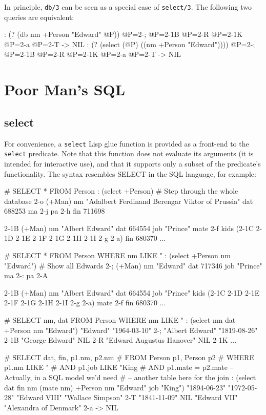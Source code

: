 In principle, \texttt{db/3} can be seen as a special case of \texttt{select/3}. The
following two queries are equivalent:


\begin{wideverbatim}
: (? (db nm +Person "Edward" @P))
 @P={2-;}
 @P={2-1B}
 @P={2-R}
 @P={2-1K}
 @P={2-a}
 @P={2-T}
-> NIL
: (? (select (@P) ((nm +Person "Edward"))))
 @P={2-;}
 @P={2-1B}
 @P={2-R}
 @P={2-1K}
 @P={2-a}
 @P={2-T}
-> NIL
\end{wideverbatim}

 
\section{Poor Man's SQL}
\label{sec:tut-poor-mans-sql}


 
\subsection{select}
\label{sec:tut-select}


For convenience, a \texttt{select} Lisp glue function is provided as a
front-end to the \texttt{select} predicate. Note that this function does not
evaluate its arguments (it is intended for interactive use), and that it
supports only a subset of the predicate's functionality. The syntax
resembles SELECT in the SQL language, for example:


\begin{wideverbatim}
# SELECT * FROM Person
: (select +Person)  # Step through the whole database
{2-o} (+Man)
   nm "Adalbert Ferdinand Berengar Viktor of Prussia"
   dat 688253
   ma {2-j}
   pa {2-h}
   fin 711698

{2-1B} (+Man)
   nm "Albert Edward"
   dat 664554
   job "Prince"
   mate {2-f}
   kids ({2-1C} {2-1D} {2-1E} {2-1F} {2-1G} {2-1H} {2-1I} {2-g} {2-a})
   fin 680370
...
\end{wideverbatim}


\begin{wideverbatim}
# SELECT * FROM Person WHERE nm LIKE "%
: (select +Person nm "Edward")  # Show all Edwards
{2-;} (+Man)
   nm "Edward"
   dat 717346
   job "Prince"
   ma {2-:}
   pa {2-A}

{2-1B} (+Man)
   nm "Albert Edward"
   dat 664554
   job "Prince"
   kids ({2-1C} {2-1D} {2-1E} {2-1F} {2-1G} {2-1H} {2-1I} {2-g} {2-a})
   mate {2-f}
   fin 680370
...

# SELECT nm, dat FROM Person WHERE nm LIKE "%
: (select nm dat +Person nm "Edward")
"Edward" "1964-03-10" {2-;}
"Albert Edward" "1819-08-26" {2-1B}
"George Edward" NIL {2-R}
"Edward Augustus Hanover" NIL {2-1K}
...

# SELECT dat, fin, p1.nm, p2.nm
#    FROM Person p1, Person p2
#    WHERE p1.nm LIKE "%
#    AND p1.job LIKE "King%
#    AND p1.mate = p2.mate  -- Actually, in a SQL model we'd need
#                           -- another table here for the join
: (select dat fin nm (mate nm) +Person nm "Edward" job "King")
"1894-06-23" "1972-05-28" "Edward VIII" "Wallace Simpson" {2-T}
"1841-11-09" NIL "Edward VII" "Alexandra of Denmark" {2-a}
-> NIL
\end{wideverbatim}

